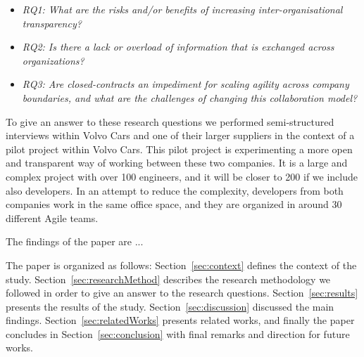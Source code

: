 \begin{itemize}
\item {\em RQ1: What are the risks and/or benefits of increasing inter-organisational transparency?}
\item {\em RQ2: Is there a lack or overload of information that is exchanged across organizations?} 
\item {\em RQ3: Are closed-contracts an impediment for scaling agility across company boundaries, and what are the challenges of changing this collaboration model?} %
\end{itemize}

To give an answer to these research questions we performed semi-structured interviews within Volvo Cars and 
one of their larger suppliers in the context of a pilot project within Volvo Cars. This pilot project is experimenting a more open and transparent way of working between these two companies. It is a large and complex project with over 100 engineers, and it will be closer to 200 if we include also developers. %
In an attempt to reduce the complexity, developers from both companies work in the same office space, and they are organized in around 30 different Agile teams. %

The findings of the paper are ...



The paper is organized as follows: Section~\ref{sec:context} defines the context of the study. Section~\ref{sec:researchMethod} describes the research methodology we followed in order to give an answer to the research questions. Section~\ref{sec:results} presents the results of the study. Section~\ref{sec:discussion} discussed the main findings. Section~\ref{sec:relatedWorks} presents related works, and finally the paper concludes in Section~\ref{sec:conclusion} with final remarks and direction for future works.